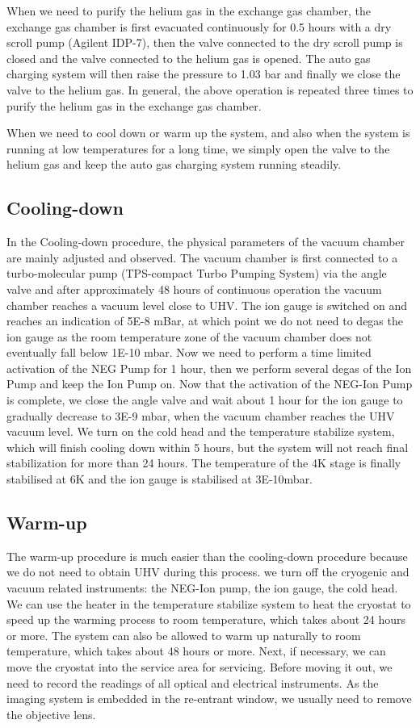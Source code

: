When we need to purify the helium gas in the exchange gas chamber, the exchange gas chamber is first evacuated continuously for 0.5 hours with a dry scroll pump (Agilent IDP-7), then the valve connected to the dry scroll pump is closed and the valve connected to the helium gas is opened. The auto gas charging system will then raise the pressure to 1.03 bar and finally we close the valve to the helium gas. In general, the above operation is repeated three times to purify the helium gas in the exchange gas chamber.

When we need to cool down or warm up the system, and also when the system is running at low temperatures for a long time, we simply open the valve to the helium gas and keep the auto gas charging system running steadily.

\subsection{Cooling-down}

In the Cooling-down procedure, the physical parameters of the vacuum chamber are mainly adjusted and observed. The vacuum chamber is first connected to a turbo-molecular pump (TPS-compact Turbo Pumping System) via the angle valve and after approximately 48 hours of continuous operation the vacuum chamber reaches a vacuum level close to UHV. The ion gauge is switched on and reaches an indication of 5E-8 mBar, at which point we do not need to degas the ion gauge as the room temperature zone of the vacuum chamber does not eventually fall below 1E-10 mbar. Now we need to perform a time limited activation of the NEG Pump for 1 hour, then we perform several degas of the Ion Pump and keep the Ion Pump on. Now that the activation of the NEG-Ion Pump is complete, we close the angle valve and wait about 1 hour for the ion gauge to gradually decrease to 3E-9 mbar, when the vacuum chamber reaches the UHV vacuum level. We turn on the cold head and the temperature stabilize system, which will finish cooling down within 5 hours, but the system will not reach final stabilization for more than 24 hours. The temperature of the 4K stage is finally stabilised at 6K and the ion gauge is stabilised at 3E-10mbar.

\subsection{Warm-up}

The warm-up procedure is much easier than the cooling-down procedure because we do not need to obtain UHV during this process. we turn off the cryogenic and vacuum related instruments: the NEG-Ion pump, the ion gauge, the cold head. We can use the heater in the temperature stabilize system to heat the cryostat to speed up the warming process to room temperature, which takes about 24 hours or more. The system can also be allowed to warm up naturally to room temperature, which takes about 48 hours or more. Next, if necessary, we can move the cryostat into the service area for servicing. Before moving it out, we need to record the readings of all optical and electrical instruments. As the imaging system is embedded in the re-entrant window, we usually need to remove the objective lens.
